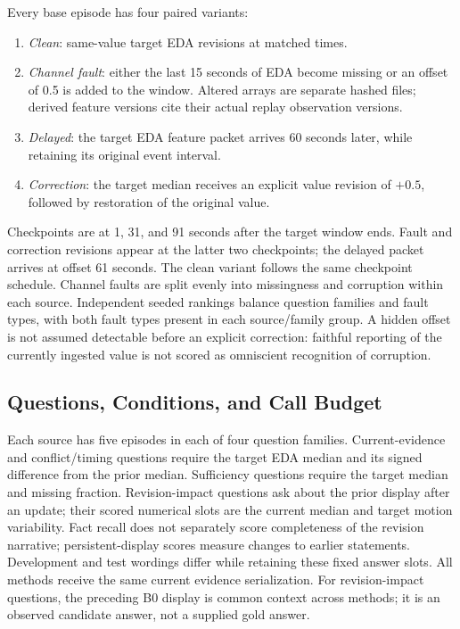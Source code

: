Every base episode has four paired variants:
\begin{enumerate}
\item \emph{Clean}: same-value target EDA revisions at matched times.
\item \emph{Channel fault}: either the last 15 seconds of EDA become missing or
an offset of 0.5 is added to the window. Altered arrays are separate hashed files;
derived feature versions cite their actual replay observation versions.
\item \emph{Delayed}: the target EDA feature packet arrives 60 seconds later,
while retaining its original event interval.
\item \emph{Correction}: the target median receives an explicit value revision
of $+0.5$, followed by restoration of the original value.
\end{enumerate}
Checkpoints are at 1, 31, and 91 seconds after the target window ends. Fault
and correction revisions appear at the latter two checkpoints; the delayed
packet arrives at offset 61 seconds. The clean variant follows the same
checkpoint schedule. Channel faults are split evenly into missingness and
corruption within each source. Independent seeded rankings balance question
families and fault types, with both fault types present in each source/family
group. A hidden offset is not assumed detectable before an explicit correction:
faithful reporting of the currently ingested value is not scored as omniscient
recognition of corruption.

\subsection{Questions, Conditions, and Call Budget}

Each source has five episodes in each of four question families. Current-evidence
and conflict/timing questions require the target EDA median and its signed
difference from the prior median. Sufficiency questions require the target median
and missing fraction. Revision-impact questions ask about the prior display after
an update; their scored numerical slots are the current median and target motion
variability. Fact recall does not separately score completeness of the revision
narrative; persistent-display scores measure changes to earlier statements.
Development and test wordings differ while retaining these fixed answer slots.
All methods receive the same current evidence serialization. For revision-impact
questions, the preceding B0 display is common context across methods; it is an
observed candidate answer, not a supplied gold answer.

